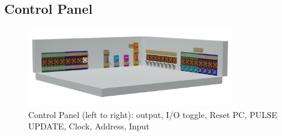 \subsection{Control Panel}
\begin{figure}[hb!]
    \begin{center}
        \includegraphics[width=0.8\textwidth]{Figures/ControlPanel.png}
        \caption[Control Panel]{Control Panel (left to right): output, I/O toggle, Reset PC, PULSE UPDATE, Clock, Address, Input}
        \label{fig::ControlPanel}
    \end{center}
\end{figure}
